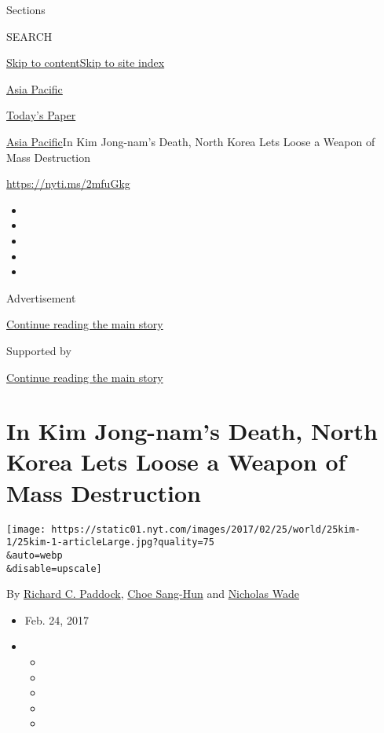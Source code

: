 Sections

SEARCH

\protect\hyperlink{site-content}{Skip to
content}\protect\hyperlink{site-index}{Skip to site index}

\href{https://www.nytimes.com/section/world/asia}{Asia Pacific}

\href{https://myaccount.nytimes.com/auth/login?response_type=cookie\&client_id=vi}{}

\href{https://www.nytimes.com/section/todayspaper}{Today's Paper}

\href{/section/world/asia}{Asia Pacific}\textbar{}In Kim Jong-nam's
Death, North Korea Lets Loose a Weapon of Mass Destruction

\url{https://nyti.ms/2mfuGkg}

\begin{itemize}
\item
\item
\item
\item
\item
\end{itemize}

Advertisement

\protect\hyperlink{after-top}{Continue reading the main story}

Supported by

\protect\hyperlink{after-sponsor}{Continue reading the main story}

\hypertarget{in-kim-jong-nams-death-north-korea-lets-loose-a-weapon-of-mass-destruction}{%
\section{In Kim Jong-nam's Death, North Korea Lets Loose a Weapon of
Mass
Destruction}\label{in-kim-jong-nams-death-north-korea-lets-loose-a-weapon-of-mass-destruction}}

\texttt{[image: https://static01.nyt.com/images/2017/02/25/world/25kim-1/25kim-1-articleLarge.jpg?quality=75\\\&auto=webp\\\&disable=upscale]}

By \href{https://www.nytimes.com/by/richard-c-paddock}{Richard C.
Paddock}, \href{http://www.nytimes.com/by/choe-sang-hun}{Choe Sang-Hun}
and \href{http://www.nytimes.com/by/nicholas-wade}{Nicholas Wade}

\begin{itemize}
\item
  Feb. 24, 2017
\item
  \begin{itemize}
  \item
  \item
  \item
  \item
  \item
  \end{itemize}
\end{itemize}

